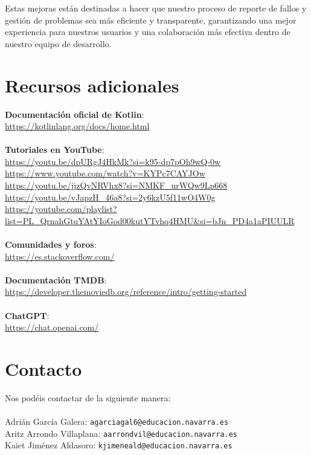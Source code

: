 \documentclass{article}
\begin{document}
    Estas mejoras están destinadas a hacer que nuestro proceso de reporte de fallos y gestión de problemas sea más eficiente y transparente, garantizando una mejor experiencia para nuestros usuarios y una colaboración más efectiva dentro de nuestro equipo de desarrollo.

\section{Recursos adicionales}

    \textbf{Documentación oficial de Kotlin}: \\
    \url{https://kotlinlang.org/docs/home.html} \\
    \\
    \textbf{Tutoriales en YouTube}: \\
    \url{https://youtu.be/dpURgJ4HkMk?si=k95-dp7pOh9wQ-0w} \\
    \url{https://www.youtube.com/watch?v=KYPc7CAYJOw} \\
    \url{https://youtu.be/jjzQvNRVhx8?si=NMKF_urWQw9Lp668} \\
    \url{https://youtu.be/vJapzH_46a8?si=2y6kzU5f11wO4W0g} \\
    \url{https://youtube.com/playlist?list=PL_QrnahGtqYAtYIoGod00kutYTvhq4HMU&si=bJn_PD4a1aPIUULR} \\
    \\
    \textbf{Comunidades y foros}: \\
    \url{https://es.stackoverflow.com/} \\
    \\
    \textbf{Documentación TMDB}: \\
    \url{https://developer.themoviedb.org/reference/intro/getting-started} \\
    \\
    \textbf{ChatGPT}: \\
    \url{https://chat.openai.com/}

\section{Contacto}

    Nos podéis contactar de la siguiente manera:
    \\
    \\
    Adrián García Galera: \texttt{agarciagal6@educacion.navarra.es} \\
    Aritz Arrondo Villaplana: \texttt{aarrondvil@educacion.navarra.es} \\
    Kaiet Jiménez Aldasoro: \texttt{kjimeneald@educacion.navarra.es}
\end{document}
